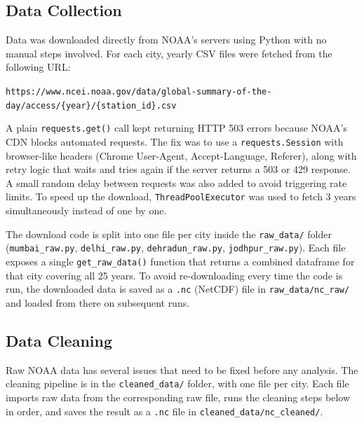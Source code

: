 \subsection{Data Collection}
Data was downloaded directly from NOAA's servers using Python with no manual
steps involved. For each city, yearly CSV files were fetched from the following URL:

\begin{center}
\texttt{https://www.ncei.noaa.gov/data/global-summary-of-the-day/access/\{year\}/\{station\_id\}.csv}
\end{center}

A plain \texttt{requests.get()} call kept returning HTTP 503 errors because NOAA's
CDN blocks automated requests. The fix was to use a \texttt{requests.Session} with
browser-like headers (Chrome User-Agent, Accept-Language, Referer), along with retry
logic that waits and tries again if the server returns a 503 or 429 response.
A small random delay between requests was also added to avoid triggering rate limits.
To speed up the download, \texttt{ThreadPoolExecutor} was used to fetch 3 years
simultaneously instead of one by one.

The download code is split into one file per city inside the \texttt{raw\_data/} folder
(\texttt{mumbai\_raw.py}, \texttt{delhi\_raw.py}, \texttt{dehradun\_raw.py},
\texttt{jodhpur\_raw.py}). Each file exposes a single \texttt{get\_raw\_data()} function
that returns a combined dataframe for that city covering all 25 years.
To avoid re-downloading every time the code is run, the downloaded data is saved
as a \texttt{.nc} (NetCDF) file in \texttt{raw\_data/nc\_raw/} and loaded from
there on subsequent runs.

\subsection{Data Cleaning}
Raw NOAA data has several issues that need to be fixed before any analysis.
The cleaning pipeline is in the \texttt{cleaned\_data/} folder, with one file
per city. Each file imports raw data from the corresponding raw file, runs
the cleaning steps below in order, and saves the result as a \texttt{.nc} file
in \texttt{cleaned\_data/nc\_cleaned/}.

